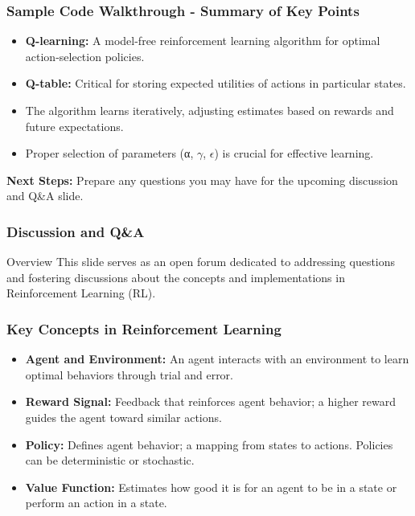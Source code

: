 \documentclass[aspectratio=169]{beamer}
\begin{document}
\begin{frame}[fragile]
    \frametitle{Sample Code Walkthrough - Summary of Key Points}
    \begin{itemize}
        \item \textbf{Q-learning:} A model-free reinforcement learning algorithm for optimal action-selection policies.
        \item \textbf{Q-table:} Critical for storing expected utilities of actions in particular states.
        \item The algorithm learns iteratively, adjusting estimates based on rewards and future expectations.
        \item Proper selection of parameters (α, $\gamma$, $\epsilon$) is crucial for effective learning.
    \end{itemize}
    
    \textbf{Next Steps:} 
    Prepare any questions you may have for the upcoming discussion and Q\&A slide.
\end{frame}

\begin{frame}[fragile]
    \frametitle{Discussion and Q\&A}
    \begin{block}{Overview}
        This slide serves as an open forum dedicated to addressing questions and fostering discussions about the concepts and implementations in Reinforcement Learning (RL).
    \end{block}
\end{frame}

\begin{frame}[fragile]
    \frametitle{Key Concepts in Reinforcement Learning}
    \begin{itemize}
        \item \textbf{Agent and Environment:} An agent interacts with an environment to learn optimal behaviors through trial and error.
        
        \item \textbf{Reward Signal:} Feedback that reinforces agent behavior; a higher reward guides the agent toward similar actions.
        
        \item \textbf{Policy:} Defines agent behavior; a mapping from states to actions. Policies can be deterministic or stochastic.
        
        \item \textbf{Value Function:} Estimates how good it is for an agent to be in a state or perform an action in a state.
    \end{itemize}
\end{frame}
\end{document}
